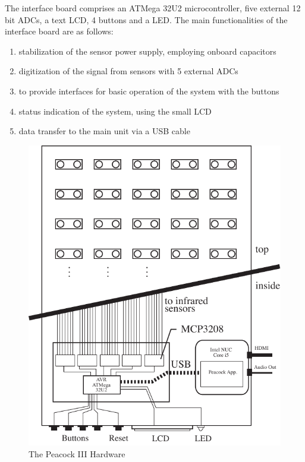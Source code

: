 \documentclass{nime-alternate}
\begin{document}
The interface board comprises an ATMega 32U2 microcontroller\cite{atmel:avr}, five external 12 bit ADCs, a text LCD, 4 buttons and a LED. The main functionalities of the interface board are as follows:

\begin{enumerate}
       \item stabilization of the sensor power supply, employing onboard capacitors
       \item digitization of the signal from sensors with 5 external ADCs
       \item to provide interfaces for basic operation of the system with the buttons
       \item status indication of the system, using the small LCD
       \item data transfer to the main unit via a USB cable
\end{enumerate}

\begin{figure}[htbp]
       \begin{center}
              \includegraphics[width=1\columnwidth]{Peacock_hardware.pdf}
       \end{center}
       \caption{The Peacock III Hardware}
       \label{fig:peacock}
\end{figure}
\end{document}

